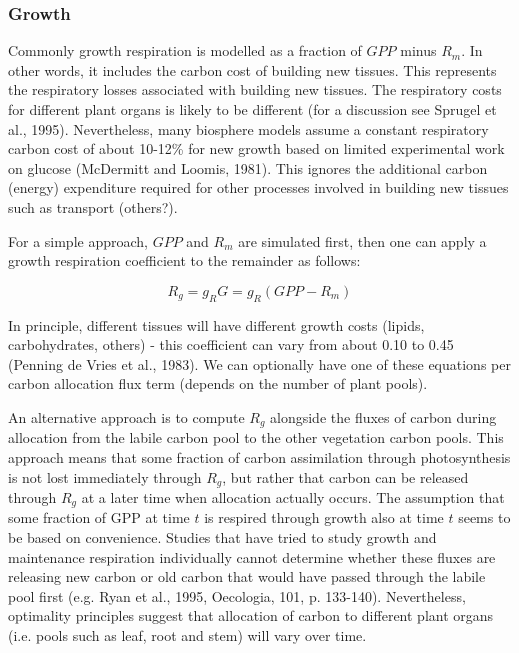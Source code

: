 \documentclass[twoside,10pt]{report}
\begin{document}
\subsubsection{Growth}

Commonly growth respiration is modelled as a fraction of $GPP$ minus $R_m$. In other words, it includes the carbon cost of building new tissues. This represents the respiratory losses associated with building new tissues. The respiratory costs for different plant organs is likely to be different (for a discussion see Sprugel et al., 1995). Nevertheless, many biosphere models assume a constant respiratory carbon cost of about 10-12\% for new growth based on limited experimental work on glucose (McDermitt and Loomis, 1981). This ignores the additional carbon (energy) expenditure required for other processes involved in building new tissues such as transport (others?). 

For a simple approach, $GPP$ and $R_m$ are simulated first, then one can apply a growth respiration coefficient to the remainder as follows: 

\begin{equation}
\label{e:rauto_growth_general}
    R_g = g_R G = g_R ( GPP - R_m )
\end{equation}

In principle, different tissues will have different growth costs (lipids, carbohydrates, others) - this coefficient can vary from about 0.10 to 0.45 (Penning de Vries et al., 1983). We can optionally have one of these equations per carbon allocation flux term (depends on the number of plant pools). 

An alternative approach is to compute $R_g$ alongside the fluxes of carbon during allocation from the labile carbon pool to the other vegetation carbon pools. This approach means that some fraction of carbon assimilation through photosynthesis is not lost immediately through $R_g$, but rather that carbon can be released through $R_g$ at a later time when allocation actually occurs. The assumption that some fraction of GPP at time $t$ is respired through growth also at time $t$ seems to be based on convenience. Studies that have tried to study growth and maintenance respiration individually cannot determine whether these fluxes are releasing new carbon or old carbon that would have passed through the labile pool first (e.g. Ryan et al., 1995, Oecologia, 101, p. 133-140). Nevertheless, optimality principles suggest that allocation of carbon to different plant organs (i.e. pools such as leaf, root and stem) will vary over time. 
\end{document}
